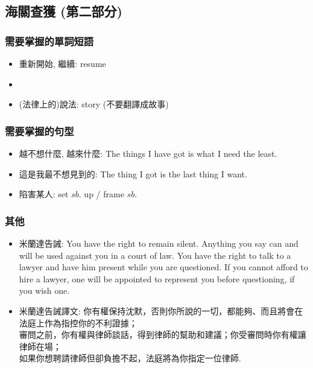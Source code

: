 \subsection{海關查獲 (第二部分)}
\subsubsection*{需要掌握的單詞短語}
\begin{itemize}
  \itemsep0em
  \item 重新開始, 繼續: resume
  \item {}
  \item (法律上的)說法: story (不要翻譯成故事)
\end{itemize}

\subsubsection*{需要掌握的句型}
\begin{itemize}
  \itemsep0em
  \item 越不想什麼, 越來什麼: The things I have got is what I need the least.
  \item 這是我最不想見到的: The thing I got is the last thing I want.
  \item 陷害某人: set $sb.$ up / frame $sb.$
\end{itemize}

\subsubsection*{其他}
\begin{itemize}
  \itemsep0em
  \item 米蘭達告誡: You have the right to remain silent. Anything you say can and will be used against you in a court of law. You have the right to talk to a lawyer and have him present while you are questioned. If you cannot afford to hire a lawyer, one will be appointed to represent you before questioning, if you wish one.
  \item 米蘭達告誡譯文: 你有權保持沈默，否則你所說的一切，都能夠、而且將會在法庭上作為指控你的不利證據；\\ 審問之前，你有權與律師談話，得到律師的幫助和建議；你受審問時你有權讓律師在場；\\ 如果你想聘請律師但卻負擔不起，法庭將為你指定一位律師.
\end{itemize}

